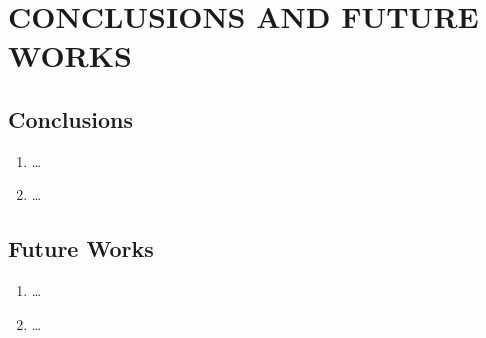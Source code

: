 \section*{\MakeUppercase{Conclusions and Future Works}}\label{chap:five}
\subsection*{Conclusions}\label{sec:conclusions}
\begin{enumerate}[leftmargin=*]
	\item \dots
    \item \dots
\end{enumerate}
\subsection*{Future Works}
\begin{enumerate}[leftmargin=*]
	\item \dots
	\item \dots
\end{enumerate}
